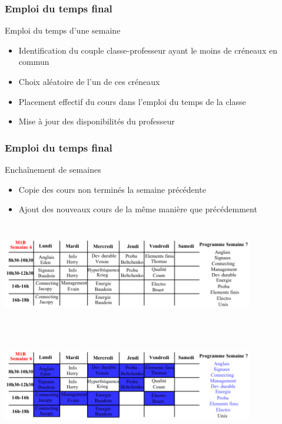 \documentclass{beamer}
\begin{document}
\begin{frame}
\frametitle{Emploi du temps final}
\begin{block}{Emploi du temps d'une semaine}
\begin{itemize}
\item Identification du couple classe-professeur ayant le moins de créneaux en commun
\item Choix aléatoire de l'un de ces créneaux
\item Placement effectif du cours dans l'emploi du temps de la classe
\item Mise à jour des disponibilités du professeur
\end{itemize}
\end{block}
\end{frame}

\begin{frame}
\frametitle{Emploi du temps final}
\begin{block}{Enchaînement de semaines}
\begin{itemize}
\item Copie des cours non terminés la semaine précédente
\item Ajout des nouveaux cours de la même manière que précédemment
\end{itemize}
\end{block}
\end{frame}

\begin{frame}
\begin{center}
\includegraphics [width=110mm, height=45mm]{Dessin3.png}
\end{center}
\end{frame}

\begin{frame}
\begin{center}
\includegraphics [width=110mm, height=45mm]{Dessin4.png}
\end{center}
\end{frame}
\end{document}
